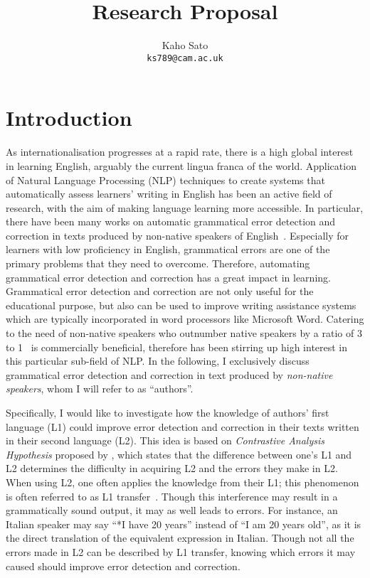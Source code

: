 \documentclass[11pt]{article}
\title{Research Proposal}
\author{
 Kaho Sato\\
  \texttt{ks789@cam.ac.uk}
}
\begin{document}
\maketitle
\section{Introduction}
As internationalisation progresses at a rapid rate, there is a high global 
interest in learning English, arguably the current lingua franca of the world. 
Application of Natural Language Processing (NLP) techniques to create systems 
that automatically assess learners' writing in English has been an active field 
of research, with the aim of making language learning more accessible. In 
particular, there have been many works on automatic grammatical error detection 
and correction in texts produced by non-native speakers of 
English~\citep{izumi2003automatic, eeg2003automatic, han2006detecting, 
tetreault2008ups, de2008classifier, gamon2008using, gamon2010using, 
ng2014conll}. Especially for learners with low proficiency in English, 
grammatical errors are one of the primary problems that they need to overcome. 
Therefore, automating grammatical error detection and correction has a great 
impact in learning. Grammatical error detection and correction are not only 
useful for the educational purpose, but also can be used to improve writing 
assistance systems which are typically incorporated in word processors like 
Microsoft Word. Catering to the need of non-native speakers who outnumber native 
speakers by a ratio of 3 to 1~\citep{sussex1999david} is commercially 
beneficial, therefore has been stirring up high interest in this particular 
sub-field of NLP. In the following, I exclusively discuss grammatical error 
detection and correction in text produced by \emph{non-native speakers}, whom I 
will refer to as ``authors''.

Specifically, I would like to investigate how the knowledge of authors' first 
language (L1) could improve error detection and correction in their texts 
written in their second language (L2). This idea is based on \emph{Contrastive 
Analysis Hypothesis} proposed by \cite{lado1957linguistics}, which states that 
the difference between one's L1 and L2 determines the difficulty in acquiring L2 
and the errors they make in L2. 
When using L2, one often applies the knowledge from their L1; this phenomenon is 
often referred to as L1 transfer~\citep{wanner1982language, frenck1997syntactic, 
dussias2003syntactic, nitschke2010first}. Though this interference may result in 
a grammatically sound output, it may as well leads to errors. For instance, an 
Italian speaker may say ``*I have 20 years'' instead of ``I am 20 years old'', 
as it is the direct translation of the equivalent expression in Italian. Though 
not all the errors made in L2 can be described by L1 transfer, knowing which 
errors it may caused should improve error detection and correction.
\end{document}
